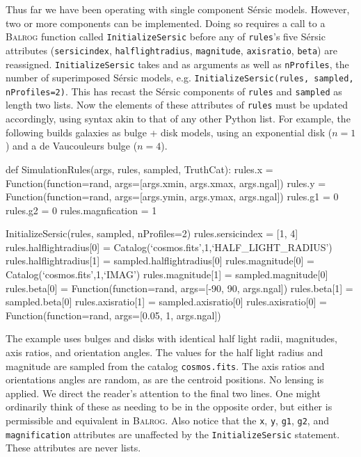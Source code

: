 \documentclass[11pt]{book}
\newcommand{\codett}[1]{\lstinline{#1}}
\newcommand{\py}{Python}
\newcommand{\balrog}{\textsc{Balrog}}
\newcommand{\sersic}{S\'{e}rsic}
\begin{document}
Thus far we have been operating with single component \sersic{} models.
However, two or more components can be implemented.
Doing so requires a call to a \balrog{} function called \codett{InitializeSersic}
before any of \codett{rules}'s five \sersic{} attributes 
(\codett{sersicindex}, \codett{halflightradius}, \codett{magnitude}, \codett{axisratio}, \codett{beta})
are reassigned.
\codett{InitializeSersic} takes \simrules{} and \simsamp{} as arguments as well as \codett{nProfiles},
the number of superimposed \sersic{} models, e.g.
\codett{InitializeSersic(rules, sampled, nProfiles=2)}.
This has recast the \sersic{} components of \codett{rules} and \codett{sampled} as length two lists.
Now the elements of these attributes of \codett{rules} must be updated accordingly,
using syntax akin to that of any other \py{} list. For example, the following builds
galaxies as bulge + disk models, using an exponential disk ($n = 1$) and a de Vaucouleurs bulge ($n = 4$).

\begin{code}
def SimulationRules(args, rules, sampled, TruthCat):
    rules.x = Function(function=rand, args=[args.xmin, args.xmax, args.ngal])
    rules.y = Function(function=rand, args=[args.ymin, args.ymax, args.ngal])
    rules.g1 = 0
    rules.g2 = 0
    rules.magnfication = 1

    InitializeSersic(rules, sampled, nProfiles=2)
    rules.sersicindex = [1, 4]
    rules.halflightradius[0] = Catalog(`cosmos.fits',1,`HALF_LIGHT_RADIUS')
    rules.halflightradius[1] = sampled.halflightradius[0]
    rules.magnitude[0] = Catalog(`cosmos.fits',1,`IMAG')
    rules.magnitude[1] = sampled.magnitude[0]
    rules.beta[0] = Function(function=rand, args=[-90, 90, args.ngal])
    rules.beta[1] = sampled.beta[0]
    rules.axisratio[1] = sampled.axisratio[0]
    rules.axisratio[0] = Function(function=rand, args=[0.05, 1, args.ngal])
\end{code}

\noindent The example uses bulges and disks with identical half light radii,
magnitudes, axis ratios, and orientation angles.
The values for the half light radius and magnitude are sampled from the catalog \codett{cosmos.fits}.
The axis ratios and orientations angles are random, as are the centroid positions.
No lensing is applied.
We direct the reader's attention to the final two lines.
One might ordinarily think of these as needing to be in the opposite order, but either is permissible 
and equivalent in \balrog{}.
Also notice that the \codett{x}, \codett{y}, \codett{g1}, \codett{g2}, and \codett{magnification}
attributes are unaffected by the \codett{InitializeSersic} statement. These attributes are never lists.
\end{document}
